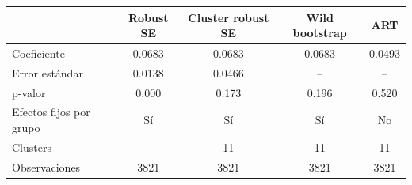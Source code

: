 {
\begin{tabular}{lcccc}
\toprule
 & Robust SE & Cluster robust SE & Wild bootstrap & ART \\
\midrule
Coeficiente & 0.0683 & 0.0683 & 0.0683 & 0.0493 \\
Error estándar & 0.0138 & 0.0466 & -- & -- \\
p-valor & 0.000 & 0.173 & 0.196 & 0.520 \\
\midrule
Efectos fijos por grupo & Sí & Sí & Sí & No \\
Clusters & -- & 11 & 11 & 11 \\
Observaciones &  3821 &  3821 &  3821 &  3821 \\
\bottomrule
\end{tabular}
}

